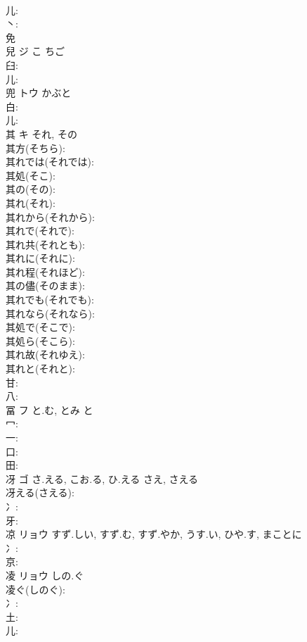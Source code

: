\documentclass[8pt]{extreport}
\begin{document}
\begin{CJK}{UTF8}{min}
\\	儿: 
\\	丶: 
\\	免 
\\	兒	ジ	こ	ちご	
\\	臼: 
\\	儿: 
\\	兜	トウ	かぶと		
\\	白: 
\\	儿: 
\\	其	キ	それ, その		
\\	其方(そちら): 
\\	其れでは(それでは): 
\\	其処(そこ): 
\\	其の(その): 
\\	其れ(それ): 
\\	其れから(それから): 
\\	其れで(それで): 
\\	其れ共(それとも): 
\\	其れに(それに): 
\\	其れ程(それほど): 
\\	其の儘(そのまま): 
\\	其れでも(それでも): 
\\	其れなら(それなら): 
\\	其処で(そこで): 
\\	其処ら(そこら): 
\\	其れ故(それゆえ): 
\\	其れと(それと): 
\\	甘: 
\\	八: 
\\	冨	フ	と.む, とみ	と	
\\	冖: 
\\	一: 
\\	口: 
\\	田: 
\\	冴	ゴ	さ.える, こお.る, ひ.える	さえ, さえる	
\\	冴える(さえる): 
\\	冫: 
\\	牙: 
\\	凉	リョウ	すず.しい, すず.む, すず.やか, うす.い, ひや.す, まことに		
\\	冫: 
\\	京: 
\\	凌	リョウ	しの.ぐ		
\\	凌ぐ(しのぐ): 
\\	冫: 
\\	土: 
\\	儿: 

\end{CJK}
\end{document}
